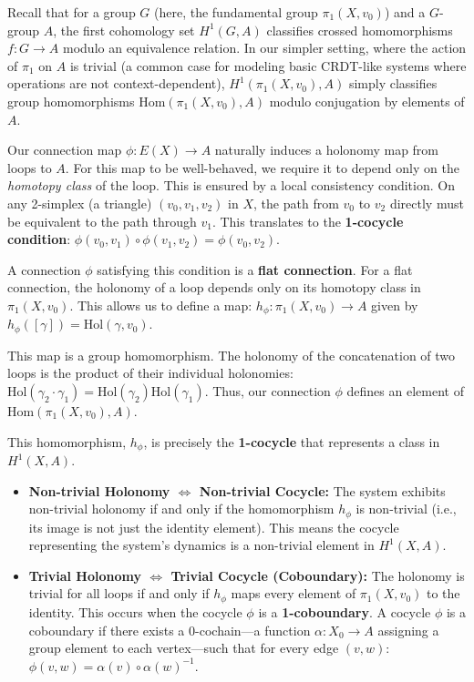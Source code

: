 \documentclass[
]{article}
\begin{document}
Recall that for a group \(G\) (here, the fundamental group
\(\pi_1(X, v_0)\)) and a \(G\)-group \(A\), the first cohomology set
\(H^1(G, A)\) classifies crossed homomorphisms \(f: G \to A\) modulo an
equivalence relation. In our simpler setting, where the action of
\(\pi_1\) on \(A\) is trivial (a common case for modeling basic
CRDT-like systems where operations are not context-dependent),
\(H^1(\pi_1(X,v_0), A)\) simply classifies group homomorphisms
\(\text{Hom}(\pi_1(X,v_0), A)\) modulo conjugation by elements of \(A\).

Our connection map \(\phi: E(X) \to A\) naturally induces a holonomy map
from loops to \(A\). For this map to be well-behaved, we require it to
depend only on the \emph{homotopy class} of the loop. This is ensured by
a local consistency condition. On any 2-simplex (a triangle)
\((v_0, v_1, v_2)\) in \(X\), the path from \(v_0\) to \(v_2\) directly
must be equivalent to the path through \(v_1\). This translates to the
\textbf{1-cocycle condition}:
\(\phi(v_0, v_1) \circ \phi(v_1, v_2) = \phi(v_0, v_2)\).

A connection \(\phi\) satisfying this condition is a \textbf{flat
connection}. For a flat connection, the holonomy of a loop depends only
on its homotopy class in \(\pi_1(X, v_0)\). This allows us to define a
map: \(h_\phi: \pi_1(X, v_0) \to A\) given by
\(h_\phi([\gamma]) = \text{Hol}(\gamma, v_0)\).

This map is a group homomorphism. The holonomy of the concatenation of
two loops is the product of their individual holonomies:
\(\text{Hol}(\gamma_2 \cdot \gamma_1) = \text{Hol}(\gamma_2)\text{Hol}(\gamma_1)\).
Thus, our connection \(\phi\) defines an element of
\(\text{Hom}(\pi_1(X, v_0), A)\).

This homomorphism, \(h_\phi\), is precisely the \textbf{1-cocycle} that
represents a class in \(H^1(X, A)\).

\begin{itemize}
\item
  \textbf{Non-trivial Holonomy \(\iff\) Non-trivial Cocycle:} The system
  exhibits non-trivial holonomy if and only if the homomorphism
  \(h_\phi\) is non-trivial (i.e., its image is not just the identity
  element). This means the cocycle representing the system's dynamics is
  a non-trivial element in \(H^1(X, A)\).
\item
  \textbf{Trivial Holonomy \(\iff\) Trivial Cocycle (Coboundary):} The
  holonomy is trivial for all loops if and only if \(h_\phi\) maps every
  element of \(\pi_1(X, v_0)\) to the identity. This occurs when the
  cocycle \(\phi\) is a \textbf{1-coboundary}. A cocycle \(\phi\) is a
  coboundary if there exists a 0-cochain---a function
  \(\alpha: X_0 \to A\) assigning a group element to each vertex---such
  that for every edge \((v, w)\):
  \(\phi(v, w) = \alpha(v) \circ \alpha(w)^{-1}\).
\end{itemize}
\end{document}
